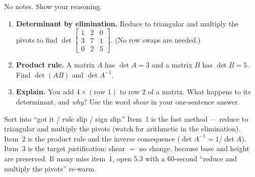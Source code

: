 \documentclass[10pt]{article}
\begin{document}
\namedateperiod

\vspace{0.15in}

No notes. Show your reasoning.

\begin{enumerate}[leftmargin=1.8em, itemsep=16pt]
  \item \textbf{Determinant by elimination.} Reduce to triangular and multiply the pivots to find
        $\det\begin{bmatrix} 1 & 2 & 0 \\ 3 & 7 & 1 \\ 0 & 2 & 5 \end{bmatrix}$. \; (No row swaps are needed.)
  \item \textbf{Product rule.} A matrix $A$ has $\det A=3$ and a matrix $B$ has $\det B=5$. Find
        $\det(AB)$ and $\det A^{-1}$.
  \item \textbf{Explain.} You add $4\times(\text{row }1)$ to row $2$ of a matrix. What happens to its
        determinant, and \emph{why}? Use the word \emph{shear} in your one-sentence answer.
\end{enumerate}

\begin{teachernote}
Sort into ``got it / rule slip / sign slip.'' Item~1 is the fast method --- reduce to triangular and
multiply the pivots (watch for arithmetic in the elimination). Item~2 is the product rule and the
inverse consequence ($\det A^{-1}=1/\det A$). Item~3 is the target justification: shear $=$ no change,
because base and height are preserved. If many miss item~1, open 5.3 with a 60-second ``reduce and
multiply the pivots'' re-warm.
\end{teachernote}
\end{document}
